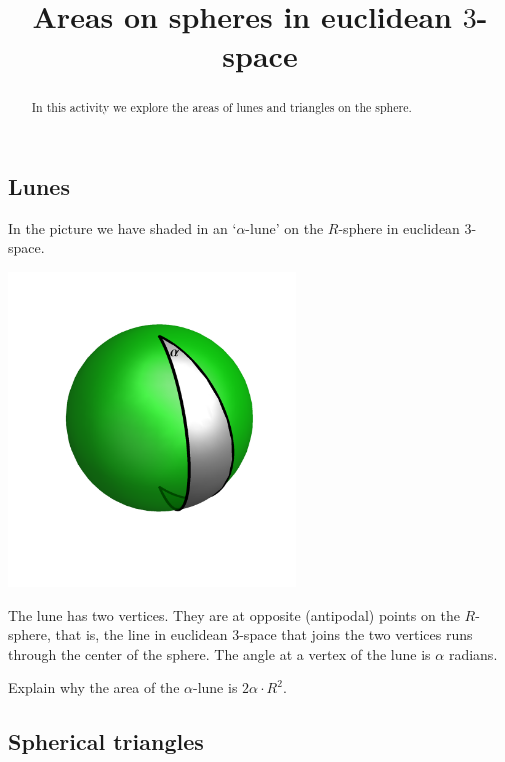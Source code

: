\documentclass{ximera}
\title{Areas on spheres in euclidean $3$-space}
\begin{document}
\begin{abstract}
In this activity we explore the areas of lunes and triangles on the sphere.
\end{abstract}
\maketitle




\subsection*{Lunes}

In the picture we have shaded in an `$\alpha$-lune' on the $R$-sphere in
euclidean $3$-space.%
\begin{image}
\includegraphics[width=3in]{W13_3.png}%
\end{image}


The lune has two vertices. They are at opposite (antipodal) points on the
$R$-sphere, that is, the line in euclidean $3$-space that joins the two
vertices runs through the center of the sphere. The angle at a vertex of the
lune is $\alpha$ radians.

\begin{problem}
\label{67} Explain why the area of the $\alpha$-lune is $2\alpha
\cdot R^{2}$.
\end{problem}


\subsection*{Spherical triangles}
\end{document}
